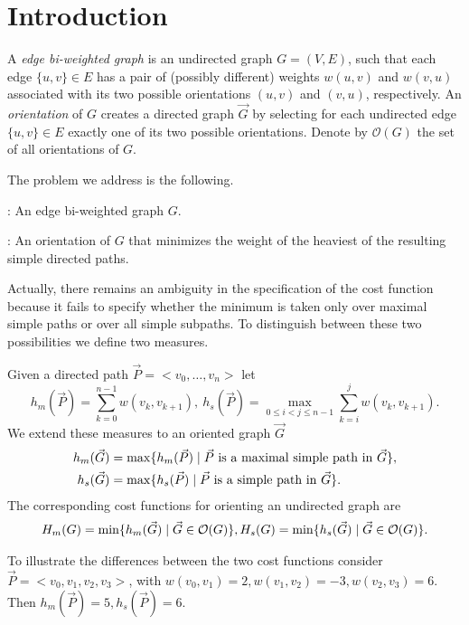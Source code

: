 \section{Introduction}

A \emph{edge bi-weighted graph} is an undirected graph $G = (V, E)$, such that each edge $\{u, v\} \in E$ has a pair of (possibly different) weights $w(u, v)$ and $w(v, u)$ associated with its two possible orientations $(u, v)$ and $(v, u)$, respectively. An \emph{orientation} 
of $G$ creates a directed graph $\vec{G}
$ 
by selecting for each undirected edge $\{u, v\} \in E$ exactly one of its two possible orientations. Denote by $\mathcal{O}(G)$ the set of all orientations of $G$. 

The problem we address is the following.

: An edge bi-weighted graph $G$.

: An orientation  of $G$ that minimizes the weight of 
the heaviest of the resulting simple directed paths.

Actually, there remains an ambiguity in the specification of the cost function because it 
fails to specify whether the minimum is taken only over maximal 
simple paths or over all simple subpaths. To distinguish between these two possibilities we define two measures.

\begin{definition}
	Given a directed path $\vec{P}=<v_0,\ldots,v_n>$ let 
\begin{equation}\label{e.h}
h_m(\vec{P})=\sum_{k=0}^{n-1} w(v_k,v_{k+1}),\ 
	h_s(\vec{P})=\max_{0\leq i<j\leq n-1}\sum_{k=i}^{j} w(v_k,v_{k+1}).
\end{equation}
	We extend these measures to an oriented graph $\vec{G}$
	\begin{align} 
	h_m(\vec{G})&=\max\{h_m(\vec{P})\mid \vec{P} \mbox{ is a maximal simple path in }\vec{G} \},\\
	h_s(\vec{G})&=\max\{h_s(\vec{P})\mid \vec{P} \mbox{ is a simple path in }\vec{G} \}.
\end{align}
The corresponding cost functions for orienting an undirected graph are 
\begin{align}
H_m(G)=\min\{h_m(\vec{G})\mid \vec{G} \in \mathcal{O}(G)\},
H_s(G)=\min\{h_s(\vec{G})\mid \vec{G} \in \mathcal{O}(G)\}.
\end{align}
\end{definition}

 To illustrate the differences between the two cost functions consider\\
 $\vec{P}=<v_0,v_1,v_2,v_3>$, with $w(v_0,v_1)=2, w(v_1,v_2)=-3,w(v_2,v_3)=6$.
 Then $h_m(\vec{P})=5, h_s(\vec{P})=6$.

